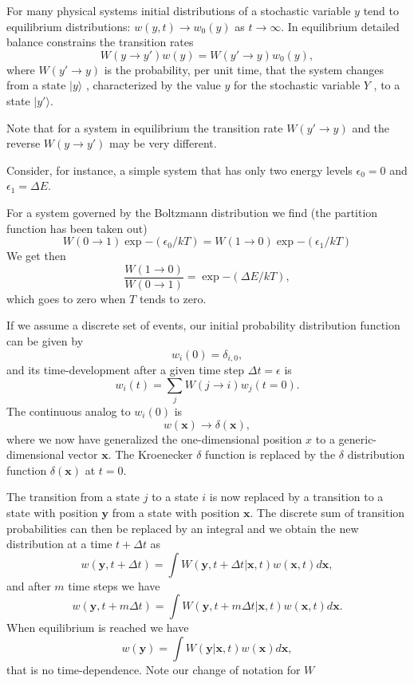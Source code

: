 \documentclass[%
oneside,                 %
final,                   %
10pt]{article}
\begin{document}
     For many physical systems initial distributions of a stochastic 
variable $y$ tend to equilibrium distributions: $w(y, t)\rightarrow w_0(y)$ 
as $t\rightarrow\infty$. In
equilibrium detailed balance constrains the transition rates
\[
     W(y\rightarrow y')w(y ) = W(y'\rightarrow y)w_0 (y),
\]
where $W(y'\rightarrow y)$ 
is the probability, per unit time, that the system changes
from a state $|y\rangle$ , characterized by the value $y$ 
for the stochastic variable $Y$ , to a state $|y'\rangle$.

Note that for a system in equilibrium the transition rate 
$W(y'\rightarrow y)$ and
the reverse $W(y\rightarrow y')$ may be very different. 

Consider, for instance, a simple
system that has only two energy levels $\epsilon_0 = 0$ and 
$\epsilon_1 = \Delta E$. 

For a system governed by the Boltzmann distribution we find (the partition function has been taken out)
\[
     W(0\rightarrow 1)\exp{-(\epsilon_0/kT)} = W(1\rightarrow 0)\exp{-(\epsilon_1/kT)}
\]
We get then
\[
     \frac{W(1\rightarrow 0)}{W(0 \rightarrow 1)}=\exp{-(\Delta E/kT)},
\]
which goes to zero when $T$ tends to zero.

If we assume a discrete set of events,
our initial probability
distribution function can be  given by 
\[
   w_i(0) = \delta_{i,0},
\]
and its time-development after a given time step $\Delta t=\epsilon$ is
\[ 
   w_i(t) = \sum_{j}W(j\rightarrow i)w_j(t=0).
\] 
The continuous analog to $w_i(0)$ is
\[
   w(\mathbf{x})\rightarrow \delta(\mathbf{x}),
\]
where we now have generalized the one-dimensional position $x$ to a generic-dimensional  
vector $\mathbf{x}$. The Kroenecker $\delta$ function is replaced by the $\delta$ distribution
function $\delta(\mathbf{x})$ at  $t=0$.  

The transition from a state $j$ to a state $i$ is now replaced by a transition
to a state with position $\mathbf{y}$ from a state with position $\mathbf{x}$. 
The discrete sum of transition probabilities can then be replaced by an integral
and we obtain the new distribution at a time $t+\Delta t$ as 
\[
   w(\mathbf{y},t+\Delta t)= \int W(\mathbf{y},t+\Delta t| \mathbf{x},t)w(\mathbf{x},t)d\mathbf{x},
\]
and after $m$ time steps we have
\[
   w(\mathbf{y},t+m\Delta t)= \int W(\mathbf{y},t+m\Delta t| \mathbf{x},t)w(\mathbf{x},t)d\mathbf{x}.
\]
When equilibrium is reached we have
\[
   w(\mathbf{y})= \int W(\mathbf{y}|\mathbf{x}, t)w(\mathbf{x})d\mathbf{x},
\]
that is no time-dependence. Note our change of notation for $W$
\end{document}
